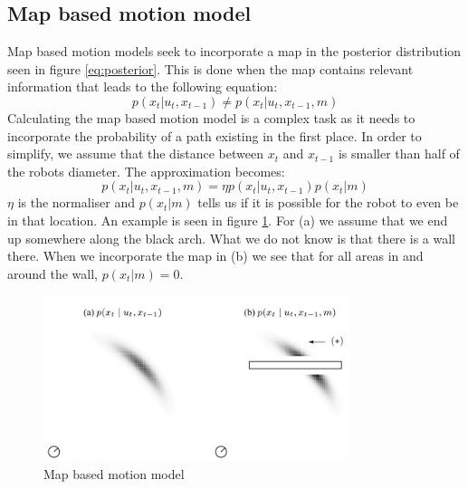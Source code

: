 \subsection{Map based motion model}
Map based motion models seek to incorporate a map in the posterior distribution seen in figure \ref{eq:posterior}. This is done when the map contains relevant information that leads to the following equation:
\begin{equation}
p(x_t | u_t,x_{t-1}) \neq p(x_t | u_t,x_{t-1},m)
\end{equation}
Calculating the map based motion model is a complex task as it needs to incorporate the probability of a path existing in the first place. In order to simplify, we assume that the distance between $x_t$ and $x_{t-1}$ is smaller than half  of the robots diameter. The approximation becomes:
\begin{equation}
p(x_t | u_t,x_{t-1},m) = \eta p(x_t | u_t,x_{t-1})p(x_t|m)
\end{equation}
$\eta$ is the normaliser and $p(x_t|m)$ tells us if it is possible for the robot to even be in that location. An example is seen in figure \ref{fig:mapbased}. For (a)  we assume that we end up somewhere along the black arch. What we do not know is that there is a wall there. When we incorporate the map in (b) we see that for all areas in and around the wall, $p(x_t|m) = 0$.
\begin{figure}[H]
\centering
\includegraphics[width=0.8\textwidth]{billeder/mapbased}
\caption{Map based motion model}
\label{fig:mapbased}
\end{figure}

